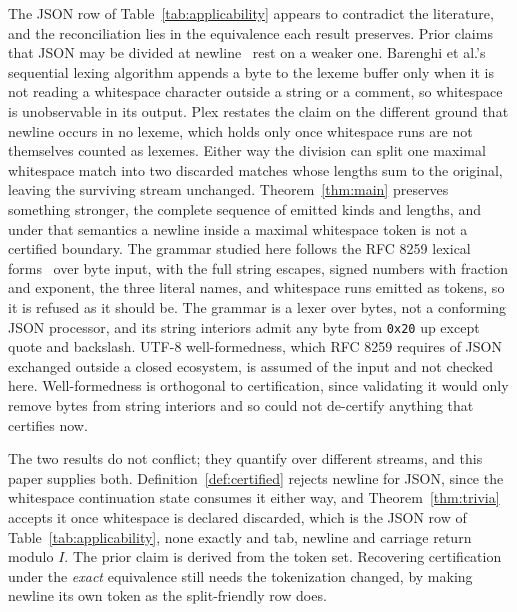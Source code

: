 \documentclass[11pt,a4paper]{article}
\theoremstyle{definition}
\theoremstyle{plain}
\newcommand{\code}[1]{\texttt{#1}}
\begin{document}
The JSON row of Table~\ref{tab:applicability} appears to contradict the literature, and the reconciliation lies in the
equivalence each result preserves. Prior claims that JSON may be divided at
newline~\cite{barenghi2015parallel,li2021plex} rest on a weaker one. Barenghi et al.'s sequential lexing algorithm
appends a byte to the lexeme buffer only when it is not reading a whitespace character outside a string or a comment, so
whitespace is unobservable in its output. Plex restates the claim on the different ground that newline occurs in no
lexeme, which holds only once whitespace runs are not themselves counted as lexemes. Either way the division can split
one maximal whitespace match into two discarded matches whose lengths sum to the original, leaving the surviving stream
unchanged. Theorem~\ref{thm:main} preserves something stronger, the complete sequence of emitted kinds and lengths, and
under that semantics a newline inside a maximal whitespace token is not a certified boundary. The grammar studied here
follows the RFC 8259 lexical forms~\cite{bray2017json} over byte input, with the full string escapes, signed numbers
with fraction and exponent, the three literal names, and whitespace runs emitted as tokens, so it is refused as it
should be. The grammar is a lexer over bytes, not a conforming JSON processor, and its string interiors admit any byte
from \code{0x20} up except quote and backslash. UTF-8 well-formedness, which RFC 8259 requires of JSON exchanged outside
a closed ecosystem, is assumed of the input and not checked here. Well-formedness is orthogonal to certification, since
validating it would only remove bytes from string interiors and so could not de-certify anything that certifies now.

The two results do not conflict; they quantify over different streams, and this paper supplies both.
Definition~\ref{def:certified} rejects newline for JSON, since the whitespace continuation state consumes it either way,
and Theorem~\ref{thm:trivia} accepts it once whitespace is declared discarded, which is the JSON row of
Table~\ref{tab:applicability}, none exactly and tab, newline and carriage return modulo $I$. The prior claim is derived
from the token set. Recovering certification under the \emph{exact} equivalence still needs the tokenization changed, by
making newline its own token as the split-friendly row does.
\end{document}
